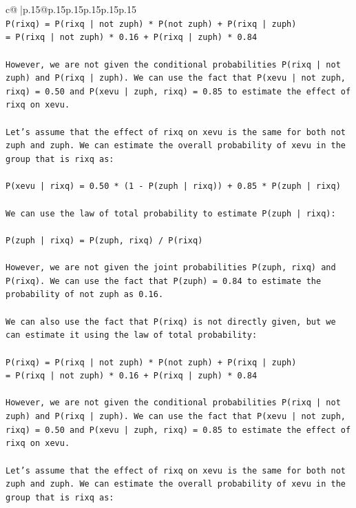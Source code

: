 \documentclass{article}
\begin{document}
{\begin{supertabular}{c@{$\;$}|p{.15\linewidth}@{}p{.15\linewidth}p{.15\linewidth}p{.15\linewidth}p{.15\linewidth}p{.15\linewidth}}
{{{\\ 
\texttt{P(rixq) = P(rixq | not zuph) * P(not zuph) + P(rixq | zuph)} \\
\texttt{= P(rixq | not zuph) * 0.16 + P(rixq | zuph) * 0.84} \\
\\ 
\texttt{However, we are not given the conditional probabilities P(rixq | not zuph) and P(rixq | zuph). We can use the fact that P(xevu | not zuph, rixq) = 0.50 and P(xevu | zuph, rixq) = 0.85 to estimate the effect of rixq on xevu.} \\
\\ 
\texttt{Let's assume that the effect of rixq on xevu is the same for both not zuph and zuph. We can estimate the overall probability of xevu in the group that is rixq as:} \\
\\ 
\texttt{P(xevu | rixq) = 0.50 * (1 {-} P(zuph | rixq)) + 0.85 * P(zuph | rixq)} \\
\\ 
\texttt{We can use the law of total probability to estimate P(zuph | rixq):} \\
\\ 
\texttt{P(zuph | rixq) = P(zuph, rixq) / P(rixq)} \\
\\ 
\texttt{However, we are not given the joint probabilities P(zuph, rixq) and P(rixq). We can use the fact that P(zuph) = 0.84 to estimate the probability of not zuph as 0.16.} \\
\\ 
\texttt{We can also use the fact that P(rixq) is not directly given, but we can estimate it using the law of total probability:} \\
\\ 
\texttt{P(rixq) = P(rixq | not zuph) * P(not zuph) + P(rixq | zuph)} \\
\texttt{= P(rixq | not zuph) * 0.16 + P(rixq | zuph) * 0.84} \\
\\ 
\texttt{However, we are not given the conditional probabilities P(rixq | not zuph) and P(rixq | zuph). We can use the fact that P(xevu | not zuph, rixq) = 0.50 and P(xevu | zuph, rixq) = 0.85 to estimate the effect of rixq on xevu.} \\
\\ 
\texttt{Let's assume that the effect of rixq on xevu is the same for both not zuph and zuph. We can estimate the overall probability of xevu in the group that is rixq as:} \\
}}}
\end{supertabular}}
\end{document}
